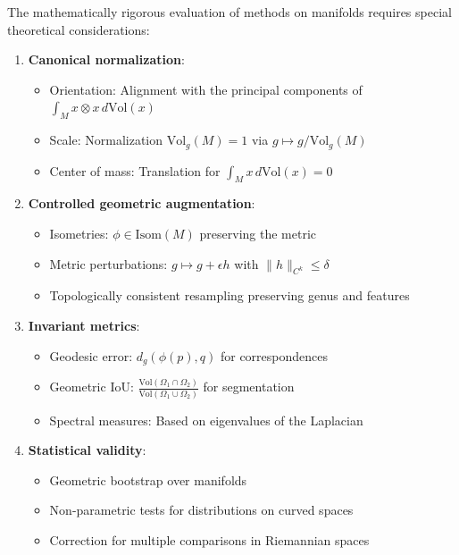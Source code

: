 The mathematically rigorous evaluation of methods on manifolds requires special theoretical considerations:

\begin{definition}
\leavevmode
\begin{enumerate}
    \item \textbf{Canonical normalization}:
    \begin{itemize}
        \item Orientation: Alignment with the principal components of $\int_M x \otimes x \, d\text{Vol}(x)$
        \item Scale: Normalization $\text{Vol}_g(M) = 1$ via $g \mapsto g/\text{Vol}_g(M)$
        \item Center of mass: Translation for $\int_M x \, d\text{Vol}(x) = 0$
    \end{itemize}

    \item \textbf{Controlled geometric augmentation}:
    \begin{itemize}
        \item Isometries: $\phi \in \text{Isom}(M)$ preserving the metric
        \item Metric perturbations: $g \mapsto g + \epsilon h$ with $\|h\|_{C^k} \leq \delta$
        \item Topologically consistent resampling preserving genus and features
    \end{itemize}

    \item \textbf{Invariant metrics}:
    \begin{itemize}
        \item Geodesic error: $d_g(\phi(p), q)$ for correspondences
        \item Geometric IoU: $\frac{\text{Vol}(\Omega_1 \cap \Omega_2)}{\text{Vol}(\Omega_1 \cup \Omega_2)}$ for segmentation
        \item Spectral measures: Based on eigenvalues of the Laplacian
    \end{itemize}

    \item \textbf{Statistical validity}:
    \begin{itemize}
        \item Geometric bootstrap over manifolds
        \item Non-parametric tests for distributions on curved spaces
        \item Correction for multiple comparisons in Riemannian spaces
    \end{itemize}
\end{enumerate}
\end{definition}

